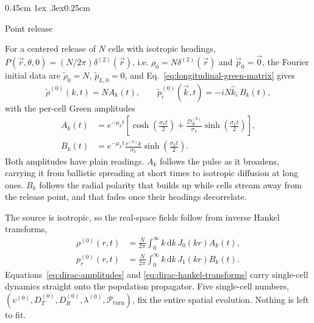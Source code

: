 \documentclass[
  reprint,
  superscriptaddress,
  amsmath,
  amssymb,
  aps,
  pre,
  nofootinbib,
  floatfix
]{revtex4-2}
\makeatletter
\newcommand{\rv}{\vec r}
\newcommand{\pv}{\vec p}
\newcommand{\dd}{\mathrm d}
\newcommand{\Pturn}{\mathcal P_{\mathrm{turn}}}
\newcommand{\DR}{\mathcal D_R^{(0)}}
\def\subsection{\@startsection{subsection}{2}{\z@}%
  {0.45cm \@plus1ex \@minus.3ex}{0.25cm}%
  {\normalfont\small\bfseries\raggedright}}%
\makeatother
\begin{document}
\subsection{Point release}
\label{sec:dirac-homogeneous}

For a centered release of $N$ cells with isotropic headings,
$P(\rv,\theta,0)=(N/2\pi)\delta^{(2)}(\rv)$, i.e.
$\rho_0=N\delta^{(2)}(\rv)$ and $\pv_0=\vec0$, the Fourier initial data are
$\tilde\rho_0=N$, $\tilde p_{L,0}=0$, and
Eq.~\eqref{eq:longitudinal-green-matrix} gives
\begin{equation}
 \tilde\rho^{(0)}(k,t) = N A_k(t), \qquad \tilde p_i^{(0)}(\vec k,t) = -i N \hat{k}_i\, B_k(t),
 \label{eq:dirac-reference-fourier-fields}
\end{equation}
with the per-cell Green amplitudes
\begin{subequations}
\label{eq:dirac-amplitudes}
\begin{align}
 A_k(t) &= e^{-\mu_k t}\left[\cosh\left(\frac{\sigma_k t}{2}\right) + \frac{\DR}{\sigma_k}\sinh\left(\frac{\sigma_k t}{2}\right)\right],
 \label{eq:dirac-density-amplitude}\\
 B_k(t) &= e^{-\mu_k t}\frac{v^{(0)}k}{\sigma_k}\sinh\left(\frac{\sigma_k t}{2}\right).
 \label{eq:dirac-polarity-amplitude}
\end{align}
\end{subequations}
Both amplitudes have plain readings.  $A_k$ follows the pulse as it broadens,
carrying it from ballistic spreading at short times to isotropic diffusion at
long ones.  $B_k$ follows the radial polarity that builds up while cells
stream away from the release point, and that fades once their headings
decorrelate.

The source is isotropic, so the real-space fields follow from
inverse Hankel transforms,
\begin{subequations}
\label{eq:dirac-hankel-transforms}
\begin{align}
 \rho^{(0)}(r,t) &= \frac{N}{2\pi}\int_0^\infty k\,\dd k\,J_0(kr) A_k(t),
 \label{eq:dirac-density-hankel}\\
 p_r^{(0)}(r,t) &= \frac{N}{2\pi}\int_0^\infty k\,\dd k\,J_1(kr) B_k(t).
 \label{eq:dirac-polarity-hankel}
\end{align}
\end{subequations}
Equations~\eqref{eq:dirac-amplitudes} and \eqref{eq:dirac-hankel-transforms}
carry single-cell dynamics straight onto the population propagator.  Five
single-cell numbers, $(v^{(0)},D_T^{(0)},D_R^{(0)},\lambda^{(0)},\Pturn)$, fix
the entire spatial evolution.  Nothing is left to fit.
\end{document}
